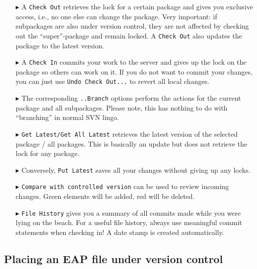 \begin{enumerate}
  \item[$\blacktriangleright$] A \texttt{Check Out} retrieves the lock for a certain package and gives you exclusive access, i.e., no one else can change the
  package. Very important: if subpackages are also under version control, they are not affected by checking out the ``super''-package and remain locked.
  A \texttt{Check Out} also updates the package to the latest version.

\item[$\blacktriangleright$] A \texttt{Check In} commits your work to the server and gives up the lock on the package so others can work on it.
If you do not want to commit your changes, you can just use \texttt{Undo Check Out...} to revert all local changes.

\item[$\blacktriangleright$]  The corresponding \texttt{..Branch} options perform the actions for the current package and all subpackages.
Please note, this has nothing to do with ``branching'' in normal SVN lingo.

\item[$\blacktriangleright$] \texttt{Get Latest/Get All Latest} retrieves the latest version of the selected package / all packages.
This is basically an update but does not retrieve the lock for any package.

\item[$\blacktriangleright$] Conversely, \texttt{Put Latest} saves all your changes without giving up any locks.

\item[$\blacktriangleright$] \texttt{Compare with controlled version} can be used to review incoming changes.
Green elements will be added, red will be deleted.

\item[$\blacktriangleright$] \texttt{File History} gives you a summary of all commits made while you were lying on the beach.
For a useful file history, always use meaningful commit statements when checking in!
A date stamp is created automatically.
\end{enumerate}



\subsection{Placing an EAP file under version control}
\label{sect:appendixB_new_EAP_for_vc}

